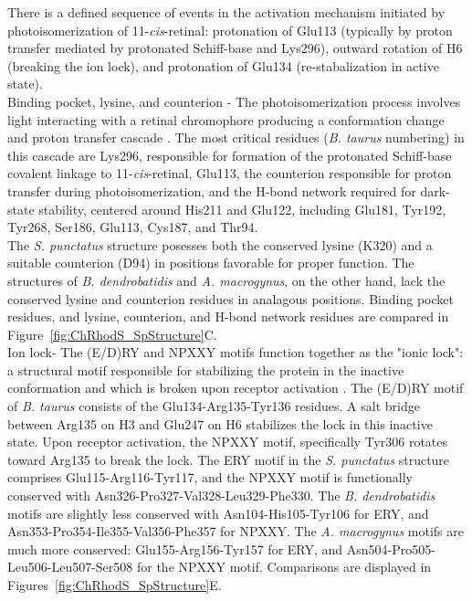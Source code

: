 \indent There is a defined sequence of events in the activation mechanism initiated by photoisomerization of 11-\textit{cis}-retinal: protonation of Glu113 (typically by proton transfer mediated by protonated Schiff-base and Lys296), outward rotation of H6 (breaking the ion lock), and protonation of Glu134 (re-stabalization in active state).\\
\indent Binding pocket, lysine, and counterion - The photoisomerization process involves light interacting with a retinal chromophore producing a conformation change and proton transfer cascade \cite{Birge1990,Smith2010}. The most critical residues (\textit{B. taurus} numbering) in this cascade are Lys296, responsible for formation of the protonated Schiff-base covalent linkage to 11-\textit{cis}-retinal, Glu113, the counterion responsible for proton transfer during photoisomerization, and the H-bond network required for dark-state stability, centered around His211 and Glu122, including Glu181, Tyr192, Tyr268, Ser186, Glu113, Cys187, and Thr94. \\
\indent The \textit{S. punctatus} structure posesses both the conserved lysine (K320) and a suitable counterion (D94) in positions favorable for proper function. The structures of \textit{B. dendrobatidis} and \textit{A. macrogynus}, on the other hand, lack the conserved lysine and counterion residues in analagous positions. Binding pocket residues, and lysine, counterion, and H-bond network residues are compared in Figure~\ref{fig:ChRhodS_SpStructure}C.\\
\indent Ion lock- The (E/D)RY and NPXXY motifs function together as the "ionic lock": a structural motif responsible for stabilizing the protein in the inactive conformation and which is broken upon receptor activation \cite{Smith2010}. The (E/D)RY motif of \textit{B. taurus} consists of the Glu134-Arg135-Tyr136 residues. A salt bridge between Arg135 on H3 and Glu247 on H6 stabilizes the lock in this inactive state. Upon receptor activation, the NPXXY motif, specifically Tyr306 rotates toward Arg135 to break the lock. The ERY motif in the \textit{S. punctatus} structure comprises Glu115-Arg116-Tyr117, and the NPXXY motif is functionally conserved with Asn326-Pro327-Val328-Leu329-Phe330. The \textit{B. dendrobatidis} motifs are slightly less conserved with Asn104-His105-Tyr106 for ERY, and Asn353-Pro354-Ile355-Val356-Phe357 for NPXXY. The \textit{A. macrogynus} motifs are much more conserved: Glu155-Arg156-Tyr157 for ERY, and Asn504-Pro505-Leu506-Leu507-Ser508 for the NPXXY motif. Comparisons are displayed in Figures~\ref{fig:ChRhodS_SpStructure}E. \\
